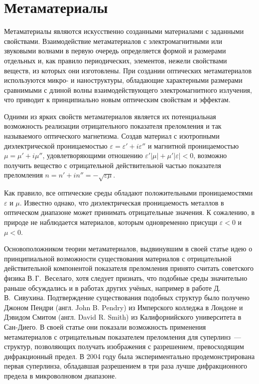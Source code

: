 \section{Метаматериалы}

Метаматериалы являются искусственно созданными материалами с заданными свойствами. Взаимодействие метаматериалов с электромагнитными или звуковыми \cite{Zhang2009} волнами в первую очередь определяется формой и размерами отдельных и, как правило периодических, элементов, нежели свойствами веществ, из которых они изготовлены. При создании оптических метаматериалов используются микро- и наноструктуры, обладающие характерными размерами сравнимыми с длиной волны взаимодействующего электромагнитного излучения, что приводит к принципиально новым оптическим свойствам и эффектам.

Одними из ярких свойств метаматериалов является их потенциальная возможность реализации отрицательного показателя преломления и так называемого оптического магнетизма. Создав материал с изотропными диэлектрической проницаемостью $\varepsilon = \varepsilon' + i\varepsilon''$ и магнитной проницаемостью $\mu = \mu' + i\mu''$, удовлетворяющими отношению $\varepsilon'\left|\mu\right| + \mu'\left|\varepsilon\right| < 0$, возможно получить вещество с отрицательной действительной частью показателя преломления $n = n' + in'' = -\sqrt{\varepsilon\mu}$. 

Как правило, все оптические среды обладают положительными проницаемостями $\varepsilon$ и $\mu$. Известно однако, что диэлектрическая проницаемость металлов в оптическом диапазоне может принимать отрицательные значения. К сожалению, в природе не наблюдается материалов, которым одновременно присущи $\varepsilon < 0$ и $\mu < 0$.

Основоположником теории метаматериалов, выдвинувшим в своей статье \cite{Veselago1967} идею о принципиальной возможности существования материалов с отрицательной действительной компонентой показателя преломления принято считать советского физика В.\,Г.~Веселаго, хотя следует признать, что подобные среды значительно раньше обсуждались и в работах других учёных, например в работе \cite{Sivoukhin1957} Д.\,В.~Сивухина. Подтверждение существования подобных структур было получено Джоном Пендри (англ. John B. Pendry) из Имперского колледжа в Лондоне и Дэвидом Смитом (англ. David R. Smith) из Калифорнийского университета в Сан-Диего. В своей статье \cite{Pendry2000} они показали возможность применения метаматериалов с отрицательным показателем преломления для суперлинз~--- структур, позволяющих получать изображения с разрешением, превосходящим дифракционный предел. В 2004 году была экспериментально продемонстрирована \cite{Grbic2004} первая суперлинза, обладавшая разрешением в три раза лучше дифракционного предела в микроволновом диапазоне.